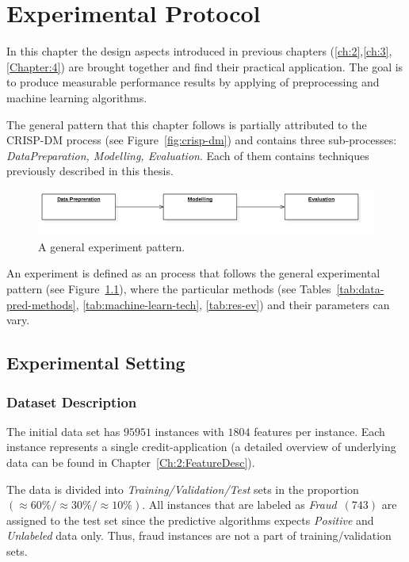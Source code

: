 \chapter{Experimental Protocol}\label{Chapter:5}

In this chapter the design aspects introduced in previous chapters (\ref{ch:2},\ref{ch:3},\ref{Chapter:4}) are brought together and find their practical application. The goal is to produce measurable performance results by applying of preprocessing and machine learning algorithms.

The general pattern that this chapter follows is partially attributed to the CRISP-DM process (see Figure~\ref{fig:crisp-dm}) and contains three sub-processes: \textit{DataPreparation, Modelling, Evaluation}. Each of them contains techniques previously described in this thesis. 

\begin{figure}[h!]
    \centering
    \includegraphics[scale=0.5]{Graphics/DeploymentDiagram1.png}
    \caption{A general experiment pattern.} %
    \label{fig:dep-dia}
\end{figure}

An experiment is defined as an process that follows the general experimental pattern (see Figure~\ref{fig:dep-dia}), where the particular methods (see Tables~\ref{tab:data-pred-methods}, \ref{tab:machine-learn-tech}, \ref{tab:res-ev}) and their parameters can vary.

\section{Experimental Setting} \label{ch:5:ES}

\subsection{Dataset Description}

The initial data set has \(95951\) instances with \(1804\) features per instance. Each instance represents a single credit-application (a detailed overview of underlying data can be found in Chapter~\ref{Ch:2:FeatureDesc}). 

The data is divided into \textit{Training/Validation/Test} sets in the proportion \((\approx60\%/\approx30\%/\approx10\%)\). All instances that are labeled as \textit{Fraud}~\((743)\) are assigned to the test set since the predictive algorithms expects \textit{Positive} and \textit{Unlabeled} data only. Thus, fraud instances are not a part of training/validation sets.

